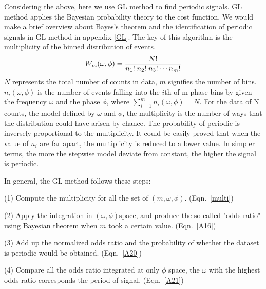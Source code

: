 \documentclass[fleqn,usenatbib]{mnras}
\begin{document}
Considering the above, here we use GL method to find periodic signals. GL method applies the Bayesian probability theory to the cost function. We would make a brief overview about Bayes's theorem and the identification of periodic signals in GL method in appendix \ref{GL}. The key of this algorithm is the multiplicity of the binned distribution of events. 
\begin{equation}\label{multi}
W_m(\omega, \phi)={{N!}\over{n_1!\; n_2!\; n_3!\cdots {n_m}!}}
\end{equation}
$N$ represents the total number of counts in data, $m$ signifies the number of bins. $n_i(\omega, \phi)$ is the number of events falling into the $i$th of m phase bins by given the frequency $\omega$ and the phase $\phi$, where $\sum\limits_{i=1}^{m}n_i(\omega, \phi)=N$. For the data of N counts, the model defined by $\omega$ and $\phi$, the multiplicity is the number of ways that the distribution could have arisen by chance. The probability of periodic is inversely proportional to the multiplicity. It could be easily proved that when the value of $n_i$ are far apart, the multiplicity is reduced to a lower value. In simpler terms, the more the stepwise model deviate from constant, the higher the signal is periodic. 

In general, the GL method follows these steps:

(1) Compute the multiplicity for all the set of $(m,\omega, \phi)$. (Eqn.~\ref{multi})

(2) Apply the integration in $(\omega, \phi)$space, and produce the so-called "odds ratio" using Bayesian theorem when $m$ took a certain value. (Eqn.~\ref{A16})

(3) Add up the normalized odds ratio and the probability of whether the dataset is periodic would be obtained. (Eqn.~\ref{A20})

(4) Compare all the odds ratio integrated at only $\phi$ space, the $\omega$ with the highest odds ratio corresponds the period of signal. (Eqn.~\ref{A21})

\end{document}
